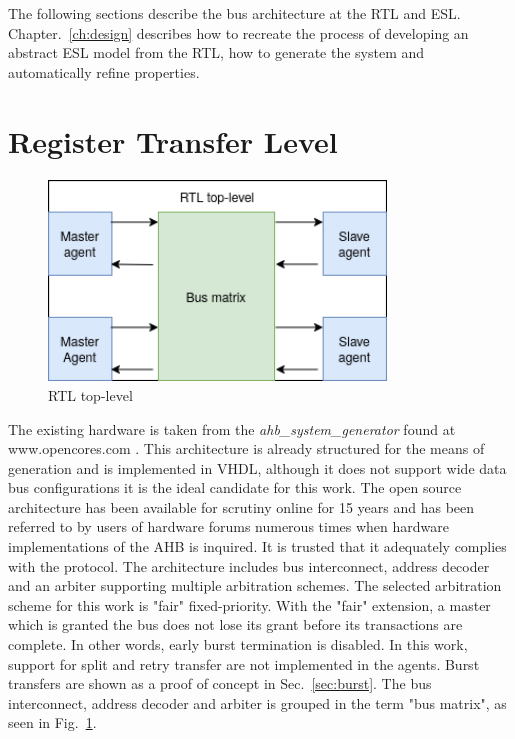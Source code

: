 The following sections describe the bus architecture at the RTL and ESL. Chapter.~\ref{ch:design} describes how to recreate the process of developing an abstract ESL model from the RTL, how to generate the system and automatically refine properties.  
\newpage

\section{Register Transfer Level}
\begin{figure}[hbt]
    \begin{center}
        \includegraphics[width=0.8\textwidth]{figs/hw/RTL_top.png}
    \end{center}
    \caption{RTL top-level}
    \label{fig:rtl-top}
\end{figure}


The existing hardware is taken from the \textit{ahb\_system\_generator} found at \\
 www.opencores.com \cite{ahbsys}. This architecture is already structured for the means of generation and is implemented in VHDL, although it does not support wide data bus configurations it is the ideal candidate for this work. The open source architecture has been available for scrutiny online for 15 years and has been referred to by users of hardware forums numerous times when hardware implementations of the AHB is inquired. It is trusted that it adequately complies with the protocol. The architecture includes bus interconnect, address decoder and an arbiter supporting multiple arbitration schemes. The selected arbitration scheme for this work is "fair" fixed-priority. With the "fair" extension, a master which is granted the bus does not lose its grant before its transactions are complete. In other words, early burst termination is disabled. In this work, support for split and retry transfer are not implemented in the agents. Burst transfers are shown as a proof of concept in Sec.~\ref{sec:burst}. The bus interconnect, address decoder and arbiter is grouped in the term "bus matrix", as seen in Fig.~\ref{fig:rtl-top}.\par   

